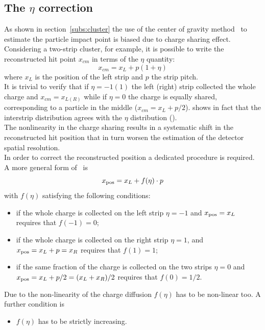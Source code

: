 \subsection{The $\eta$ correction}\label{sect:eta_correction}
As shown in section~\ref{subs:cluster} the use of the center of gravity
method~ to estimate the particle impact point is biased due to
charge sharing effect. Considering a two-strip cluster, for example, it is
possible to write the reconstructed hit point $x_{cm}$ in terms of the $\eta$ quantity:
\begin{equation}\label{eq:cm_eta}
x_{cm} = x_L+p \left(1+\eta\right)
\end{equation}
where $x_L$ is the position of the left strip and $p$ the strip pitch.\\
It is trivial to verify that if $\eta=-1(1)$ the left (right) strip collected
the whole charge and $x_{cm} = x_{L(R)}$ while if $\eta=0$ the charge is equally
shared, corresponding to a particle in the middle ($x_{cm} =
x_{L}+p/2$).  shows in fact that the interstrip
distribution agrees with the $\eta$ distribution (\fig{}).\\
The nonlinearity in the charge sharing results in a systematic shift in the
reconstructed hit position that in turn worsen the estimation of the detector
spatial resolution.\\
In order to correct the reconstructed position a dedicated procedure is
required. A more general form of~ is
\begin{equation}\label{eq:eta_correction}
x_{\rm pos} = x_L+f(\eta) \cdot p
\end{equation}
with $f(\eta)$ satisfying the following conditions:
\begin{itemize}
\item if the whole charge is collected on the left strip $\eta=-1$ and $x_{\rm
    pos} = x_L$ requires that $f(-1)=0$;
\item if the whole charge is collected on the right strip $\eta=1$, and $x_{\rm
    pos} = x_L+p = x_R$ requires that $f(1)=1$;
\item if the same fraction of the charge is collected on the two strips $\eta=0$
  and $x_{\rm pos} = x_L+p/2 = (x_L + x_R)/2$ requires that $f(0) = 1/2$.
\end{itemize}
Due to the non-linearity of the charge diffusion $f(\eta)$ has to be non-linear
too. A further condition is
\begin{itemize}
\item $f(\eta)$ has to be strictly increasing.
\end{itemize}

